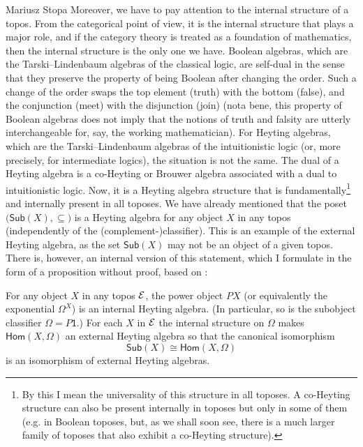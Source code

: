\begin{artengenv}{Mariusz Stopa}
Moreover, we have to pay attention to the internal structure of a topos. From the categorical point of view, it is the internal structure that plays a major role, and if the category theory is treated as a foundation of mathematics, then the internal structure is the only one we have. Boolean algebras, which are the Tarski--Lindenbaum algebras of the classical logic, are self-dual in the sense that they preserve the property of being Boolean after changing the order. Such a change of the order swaps the top element (truth) with the bottom (false), and the conjunction (meet) with the disjunction (join) (nota bene, this property of Boolean algebras does not imply that the notions of truth and falsity are utterly interchangeable for, say, the working mathematician). For Heyting algebras, which are the Tarski--Lindenbaum algebras of the intuitionistic logic (or, more precisely, for intermediate logics), the situation is not the same. The dual of a Heyting algebra is a co-Heyting or Brouwer algebra associated with a dual to intuitionistic logic. Now, it is a Heyting algebra structure that is fundamentally\footnote{By this I mean the universality of this structure in all toposes. A co-Heyting structure can also be present internally in toposes but only in some of them (e.g. in Boolean toposes, but, as we shall soon see, there is a much larger family of toposes that also exhibit a co-Heyting structure).} and internally present in all toposes. We have already mentioned that the poset $ \big(\textsf{Sub}(X), \subseteq\!\big) $ is a Heyting algebra for any object $ X $ in any topos (independently of the (complement-)classifier). This is an example of the external Heyting algebra, as the set $ \textsf{Sub}(X) $ may not be an object of a given topos. There is, however, an internal version of this statement, which I formulate in the form of a proposition without proof, based on \parencite[p.201]{maclane-moerdijk-1994}:

\begin{proposition-stopa}
	For any object $ X $ in any topos $ \mathcal{E} $, the power object $ PX $ (or equivalently the exponential $ \Omega^X $) is an internal Heyting algebra. (In particular, so is the subobject classifier $ \Omega = P \textsf{1} $.) For each $ X $ in $ \mathcal{E} $ the internal structure on $ \Omega $ makes $ \textsf{Hom}(X,\Omega) $ an external Heyting algebra so that the canonical isomorphism
	\begin{equation}\label{iso}
	\textsf{Sub}(X)\cong\textsf{Hom}(X,\Omega)
	\end{equation}
	is an isomorphism of external Heyting algebras.
\end{proposition-stopa}



\end{artengenv}
